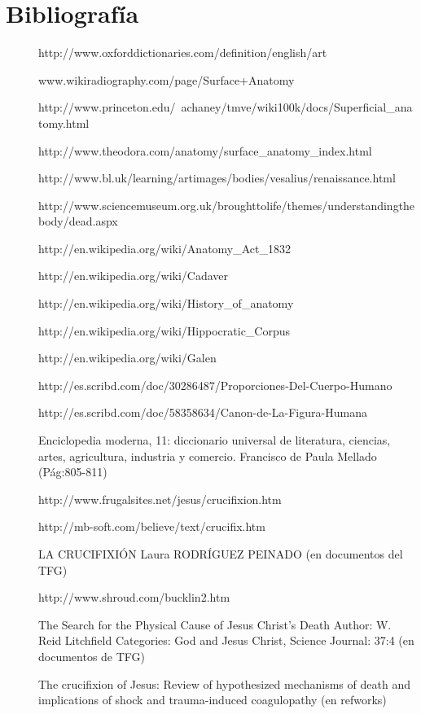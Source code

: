 \section{Bibliografía}
\begin{description}
\item[] http://www.oxforddictionaries.com/definition/english/art
\item[] www.wikiradiography.com/page/Surface+Anatomy
\item[] http://www.princeton.edu/~achaney/tmve/wiki100k/docs/Superficial\_anatomy.html
\item[] http://www.theodora.com/anatomy/surface\_anatomy\_index.html

\item[] http://www.bl.uk/learning/artimages/bodies/vesalius/renaissance.html
\item[] http://www.sciencemuseum.org.uk/broughttolife/themes/understandingthebody/dead.aspx
\item[] http://en.wikipedia.org/wiki/Anatomy\_Act\_1832
\item[] http://en.wikipedia.org/wiki/Cadaver
\item[] http://en.wikipedia.org/wiki/History\_of\_anatomy
\item[] http://en.wikipedia.org/wiki/Hippocratic\_Corpus
\item[] http://en.wikipedia.org/wiki/Galen

\item[] http://es.scribd.com/doc/30286487/Proporciones-Del-Cuerpo-Humano
\item[] http://es.scribd.com/doc/58358634/Canon-de-La-Figura-Humana

\item[] Enciclopedia moderna, 11: diccionario universal de literatura, ciencias, artes, agricultura, industria y comercio. Francisco de Paula Mellado (Pág:805-811)
\item[] http://www.frugalsites.net/jesus/crucifixion.htm
\item[] http://mb-soft.com/believe/text/crucifix.htm
\item[] LA CRUCIFIXIÓN Laura RODRÍGUEZ PEINADO (en documentos del TFG)
\item[] http://www.shroud.com/bucklin2.htm
\item[] The Search for the Physical Cause of Jesus Christ's Death Author: W. Reid Litchfield Categories: God and Jesus Christ, Science Journal: 37:4 (en documentos de TFG)
\item[] The crucifixion of Jesus: Review of hypothesized mechanisms of death and implications of shock and trauma-induced coagulopathy (en refworks)


\end{description}
